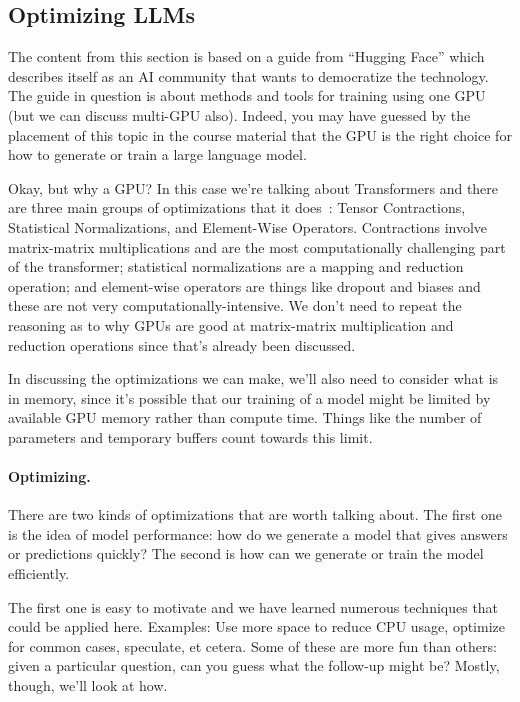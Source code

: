 \subsection*{Optimizing LLMs}
The content from this section is based on a guide from ``Hugging Face'' which describes itself as an AI community that wants to democratize the technology. The guide in question is about methods and tools for training using one GPU~\cite{hf} (but we can discuss multi-GPU also). Indeed, you may have guessed by the placement of this topic in the course material that the GPU is the right choice for how to generate or train a large language model. 

Okay, but why a GPU? In this case we're talking about Transformers and there are three main groups of optimizations that it does~\cite{hf2}: Tensor Contractions, Statistical Normalizations, and Element-Wise Operators. Contractions involve matrix-matrix multiplications and are the most computationally challenging part of the transformer; statistical normalizations are a mapping and reduction operation; and element-wise operators are things like dropout and biases and these are not very computationally-intensive. We don't need to repeat the reasoning as to why GPUs are good at matrix-matrix multiplication and reduction operations since that's already been discussed. 

In discussing the optimizations we can make, we'll also need to consider what is in memory, since it's possible that our training of a model might be limited by available GPU memory rather than compute time. Things like the number of parameters and temporary buffers count towards this limit.

\paragraph{Optimizing.} There are two kinds of optimizations that are worth talking about. The first one is the idea of model performance: how do we generate a model that gives answers or predictions quickly? The second is how can we generate or train the model efficiently.

The first one is easy to motivate and we have learned numerous techniques that could be applied here. Examples: Use more space to reduce CPU usage, optimize for common cases, speculate, et cetera. Some of these are more fun than others: given a particular question, can you guess what the follow-up might be? Mostly, though, we'll look at how.

